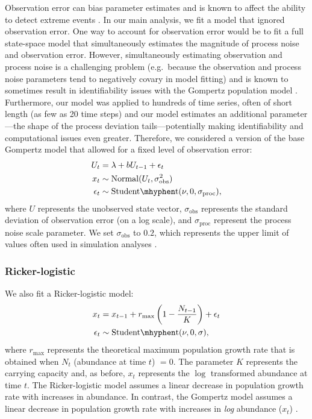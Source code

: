 Observation error can bias parameter estimates \citep[e.g.][]{knape2012} and
is known to affect the ability to detect extreme events \citep{ward2007}. In
our main analysis, we fit a model that ignored observation error. One way to
account for observation error would be to fit a full state-space model that
simultaneously estimates the magnitude of process noise and observation error.
However, simultaneously estimating observation and process noise is a
challenging problem (e.g.\ because the observation and process noise
parameters tend to negatively covary in model fitting) and is known to
sometimes result in identifiability issues with the Gompertz population model
\citep{knape2008}. Furthermore, our model was applied to hundreds of time
series, often of short length (as few as 20 time steps) and our model
estimates an additional parameter---the shape of the process deviation
tails---potentially making identifiability and computational issues even
greater. Therefore, we considered a version of the base Gompertz model that
allowed for a fixed level of observation error:
\begin{align*}
U_t &= \lambda + b U_{t-1} + \epsilon_t\\
x_t &\sim \mathrm{Normal}(U_t, \sigma_\mathrm{obs}^2)\\
\epsilon_t &\sim \mathrm{Student\mhyphen t}(\nu, 0, \sigma_\mathrm{proc}),
\end{align*}
where $U$ represents the unobserved state vector, $\sigma_\mathrm{obs}$
represents the standard deviation of observation error (on a log scale), and
$\sigma_\mathrm{proc}$ represent the process noise scale parameter. We set
$\sigma_\mathrm{obs}$ to $0.2$, which represents the upper limit of values
often used in simulation analyses \citep[e.g.][]{valpine2002, thorson2014b}.

\subsubsection{Ricker-logistic}

We also fit a Ricker-logistic model:
\begin{align*}
x_t &= x_{t-1} + r_{\mathrm{max}}\left(1 - \frac{N_{t-1}}{K}\right) + \epsilon_t\\
\epsilon_t &\sim \mathrm{Student\mhyphen t}(\nu, 0, \sigma),
\end{align*}
where $r_\mathrm{max}$ represents the theoretical maximum population growth
rate that is obtained when $N_t$ (abundance at time $t$) $= 0$. The parameter
$K$ represents the carrying capacity and, as before, $x_t$ represents the
$\log$ transformed abundance at time $t$. The Ricker-logistic model assumes a
linear decrease in population growth rate with increases in abundance. In
contrast, the Gompertz model assumes a linear decrease in population growth
rate with increases in \textit{log} abundance ($x_t$)
\citep[e.g.][]{thibaut2012}.


